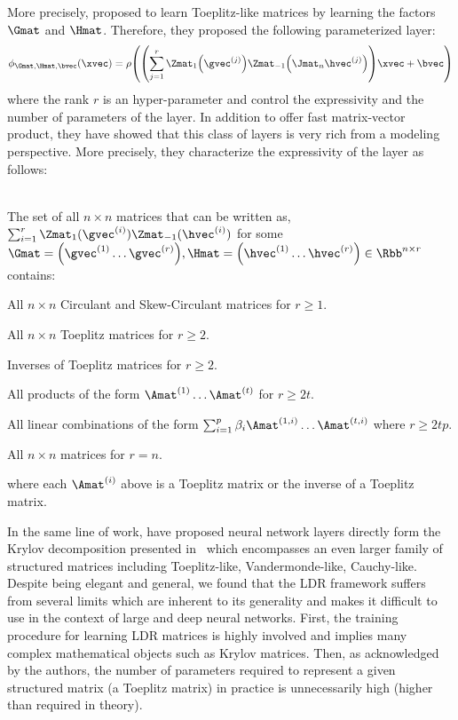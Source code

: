 More precisely, \citet{sindhwani2015structured} proposed to learn Toeplitz-like matrices by learning the factors $\Gmat$ and $\Hmat$. 
Therefore, they proposed the following parameterized layer:
\begin{equation}
  \layer_{\Gmat, \Hmat, \bvec}(\xvec) = \act \left( \left(\sum_{j=1}^{r} \Zmat_1\left(\gvec^{(j)}\right) \Zmat_{-1}\left(\Jmat_n \hvec^{(j)}\right) \right) \xvec + \bvec \right)
\end{equation}
where the rank $r$ is an hyper-parameter and control the expressivity and the number of parameters of the layer.
In addition to offer fast matrix-vector product, they have showed that this class of layers is very rich from a modeling perspective.
More precisely, they characterize the expressivity of the layer as follows: 
\begin{theorem} ~\\
  The set of all $n \times n$ matrices that can be written as, $\sum_{i=1}^{r} \Zmat_1(\gvec^{(i)}) \Zmat_{-1}(\hvec^{(i)})$
  for some $\Gmat = \leftmat \gvec^{(1)} \ldots \gvec^{(r)} \rightmat,
  \Hmat = \leftmat \hvec^{(1)} \ldots \hvec^{(r)} \rightmat \in \Rbb^{n \times r}$ contains:
  \begin{compactitem}
    \item All $n \times n$ Circulant and Skew-Circulant matrices for $r \geq 1$.
    \item All $n \times n$ Toeplitz matrices for $r \geq 2$.
    \item Inverses of Toeplitz matrices for $r \geq 2$.
    \item All products of the form $\Amat^{(1)} \ldots \Amat^{(t)}$ for $r \geq 2t$.
    \item All linear combinations of the form $\sum_{i=1}^p \beta_i \Amat^{(1, i)} \ldots \Amat^{(t, i)}$ where $r \geq 2tp$.
    \item All $n\times n$ matrices for $r=n$.
  \end{compactitem}
  where each $\Amat^{(i)}$ above is a Toeplitz matrix or the inverse of a Toeplitz matrix. 
\end{theorem}
\noindent

In the same line of work, \citet{thomas2018learning} have proposed neural network layers directly form the Krylov decomposition presented in~ which encompasses an even larger family of structured matrices including Toeplitz-like, Vandermonde-like, Cauchy-like.
Despite being elegant and general, we found that the LDR framework suffers from several limits which are inherent to its generality and makes it difficult to use in the context of large and deep neural networks.
First, the training procedure for learning LDR matrices is highly involved and implies many complex mathematical objects such as Krylov matrices.
Then, as acknowledged by the authors, the number of parameters required to represent a given structured matrix (a Toeplitz matrix) in practice is unnecessarily high (higher than required in theory). 



